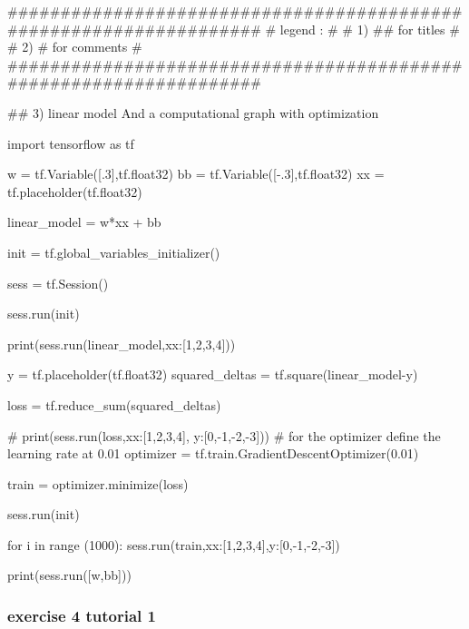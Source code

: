 \documentclass[11pt]{article}
\begin{document}
\begin{python}

###################################################################
# legend :                                                        #
#         1) ## for titles                                        #
#         2) #  for comments                                      #
###################################################################  

## 3) linear model And a computational graph with optimization

import tensorflow as tf

w = tf.Variable([.3],tf.float32)
bb = tf.Variable([-.3],tf.float32)
xx = tf.placeholder(tf.float32)

linear_model = w*xx + bb

init = tf.global_variables_initializer()

sess = tf.Session()

sess.run(init)

print(sess.run(linear_model,{xx:[1,2,3,4]}))

y = tf.placeholder(tf.float32)
squared_deltas = tf.square(linear_model-y)

loss = tf.reduce_sum(squared_deltas)

# print(sess.run(loss,{xx:[1,2,3,4], y:[0,-1,-2,-3]}))
# for the optimizer define the learning rate at 0.01
optimizer =  tf.train.GradientDescentOptimizer(0.01)

train = optimizer.minimize(loss)

sess.run(init)

for i in range (1000):
    sess.run(train,{xx:[1,2,3,4],y:[0,-1,-2,-3]})

print(sess.run([w,bb]))

\end{python}

\subsubsection{exercise 4  tutorial 1}
\end{document}
